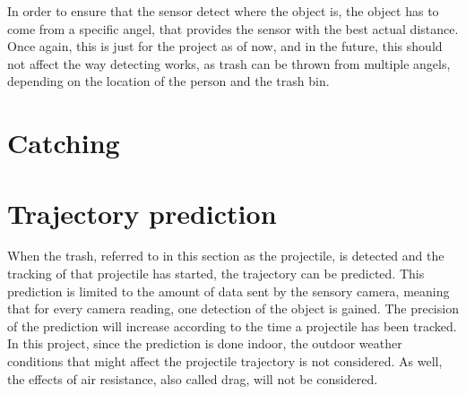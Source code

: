 In order to ensure that the sensor detect where the object is, the object has to come from a specific angel, that provides the sensor with the best actual distance. Once again, this is just for the project as of now, and in the future, this should not affect the way detecting works, as trash can be thrown from multiple angels, depending on the location of the person and the trash bin.


\section{Catching}
\label{sec:catchingTheory}

\section{Trajectory prediction}
\label{sec:Trajectory prediction}
When the trash, referred to in this section as the projectile, is detected and the tracking of that projectile has started, the trajectory can be predicted. This prediction is limited to the amount of data sent by the sensory camera, meaning that for every camera reading, one detection of the object is gained. The precision of the prediction will increase according to the time a projectile has been tracked. \newline 
In this project, since the prediction is done indoor, the outdoor weather conditions that might affect the projectile trajectory is not considered. As well, the effects of air resistance, also called drag, will not be considered.

